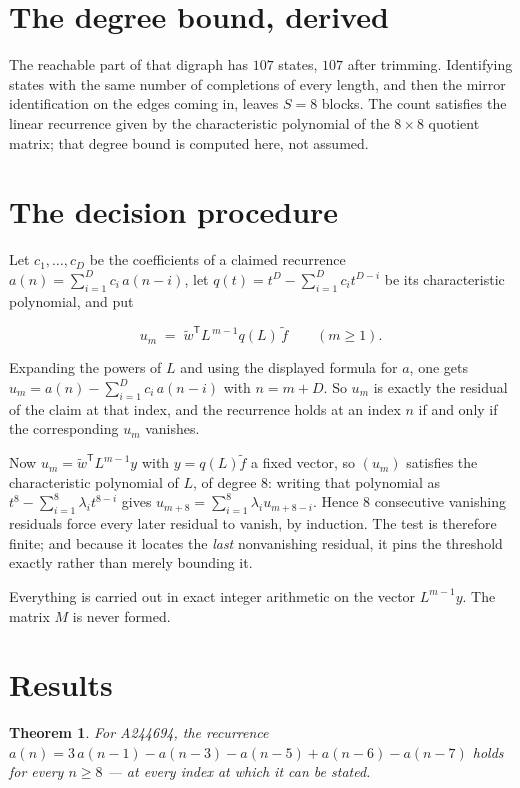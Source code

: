 \documentclass[11pt]{article}
\newtheorem{theorem}{Theorem}
\theoremstyle{definition}
\begin{document}
\section{The degree bound, derived}

The reachable part of that digraph has $107$ states, $107$ after trimming. Identifying states with the same number of completions of every length, and then the mirror identification on the edges coming in, leaves $S = 8$ blocks. The count satisfies the linear recurrence given by the characteristic polynomial of the $8\times8$ quotient matrix; that degree bound is computed here, not assumed.

\section{The decision procedure}

Let $c_1,\dots,c_D$ be the coefficients of a claimed recurrence $a(n) = \sum_{i=1}^{D} c_i\,a(n-i)$, let $q(t) = t^{D} - \sum_{i=1}^{D} c_i t^{D-i}$ be its characteristic polynomial, and put

\[u_m \;=\; \tilde w^{\mathsf T} L^{\,m-1} q(L)\,\tilde f \qquad (m \ge 1).\]

Expanding the powers of $L$ and using the displayed formula for $a$, one gets $u_m = a(n) - \sum_{i=1}^{D} c_i\,a(n-i)$ with $n = m + D$. So $u_m$ is exactly the residual of the claim at that index, and the recurrence holds at an index $n$ if and only if the corresponding $u_m$ vanishes.

Now $u_m = \tilde w^{\mathsf T} L^{m-1} y$ with $y = q(L)\tilde f$ a fixed vector, so $(u_m)$ satisfies the characteristic polynomial of $L$, of degree $8$: writing that polynomial as $t^{8} - \sum_{i=1}^{8} \lambda_i t^{8-i}$ gives $u_{m+8} = \sum_{i=1}^{8} \lambda_i u_{m+8-i}$. Hence $8$ consecutive vanishing residuals force every later residual to vanish, by induction. The test is therefore finite; and because it locates the {\itshape last} nonvanishing residual, it pins the threshold exactly rather than merely bounding it.

Everything is carried out in exact integer arithmetic on the vector $L^{m-1}y$. The matrix $M$ is never formed.

\section{Results}

\begin{theorem} For A244694, the recurrence $a(n) = 3\,a(n-1) - a(n-3) - a(n-5) + a(n-6) - a(n-7)$ holds for every $n \ge 8$ --- at every index at which it can be stated.\end{theorem}
\end{document}

